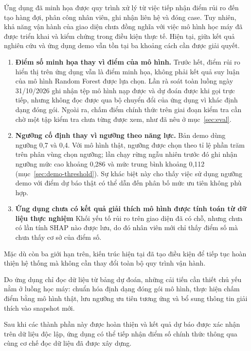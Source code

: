 \documentclass[12pt,a4paper]{report}
\begin{document}
Ứng dụng đã minh họa được quy trình xử lý từ việc tiếp nhận điểm rủi ro đến tạo hàng đợi, phân công nhân viên, ghi nhận liên hệ và đóng case. Tuy nhiên, khả năng vận hành của giao diện chưa đồng nghĩa với việc mô hình học máy đã được triển khai và kiểm chứng trong điều kiện thực tế. Hiện tại, giữa kết quả nghiên cứu và ứng dụng demo vẫn tồn tại ba khoảng cách cần được giải quyết.

\begin{enumerate}
  \item \textbf{Điểm số minh họa thay vì điểm của mô hình.} Trước hết, điểm rủi ro hiển thị trên ứng dụng vẫn là điểm minh họa, không phải kết quả suy luận của mô hình Random Forest được lựa chọn. Lần rà soát toàn luồng ngày 31/10/2026 ghi nhận tệp mô hình nạp được và dự đoán được khi gọi trực tiếp, nhưng không đọc được qua bộ chuyển đổi của ứng dụng vì khác định dạng đóng gói. Ngoài ra, chấm điểm chính thức trên giai đoạn kiểm tra cần chờ một tập kiểm tra chưa từng được xem, như đã nêu ở mục~\ref{sec:eval}.
  \item \textbf{Ngưỡng cố định thay vì ngưỡng theo năng lực.} Bản demo dùng ngưỡng 0,7 và 0,4. Với mô hình thật, ngưỡng được chọn theo tỉ lệ phần trăm trên phân vùng chọn ngưỡng; lần chạy rừng ngẫu nhiên trước đó ghi nhận ngưỡng mức cao khoảng 0,286 và mức trung bình khoảng 0,112 (mục~\ref{sec:demo-threshold}). Sự khác biệt này cho thấy việc sử dụng ngưỡng demo với điểm dự báo thật có thể dẫn đến phân bố mức ưu tiên không phù hợp.
  \item \textbf{Ứng dụng chưa có kết quả giải thích mô hình được tính toán từ dữ liệu thực nghiệm} Khối yếu tố rủi ro trên giao diện đã có chỗ, nhưng chưa có lần tính SHAP nào được lưu, do đó nhân viên mới chỉ thấy điểm số mà chưa thấy cơ sở của điểm số.
\end{enumerate}

Mặc dù còn ba giới hạn trên, kiến trúc hiện tại đã tạo điều kiện để tiếp tục hoàn thiện hệ thống mà không cần thay đổi toàn bộ quy trình vận hành.

Do ứng dụng chỉ đọc dữ liệu từ bảng dự đoán, những cải tiến cần thiết chủ yếu nằm ở luồng học máy: chuẩn hóa định dạng đóng gói mô hình, thực hiện chấm điểm bằng mô hình thật, lưu ngưỡng ưu tiên tương ứng và bổ sung thông tin giải thích vào snapshot mới.

Sau khi các thành phần này được hoàn thiện và kết quả dự báo được xác nhận trên dữ liệu độc lập, ứng dụng có thể tiếp nhận điểm số chính thức thông qua cùng cơ chế đọc dữ liệu đã được xây dựng.
\end{document}
